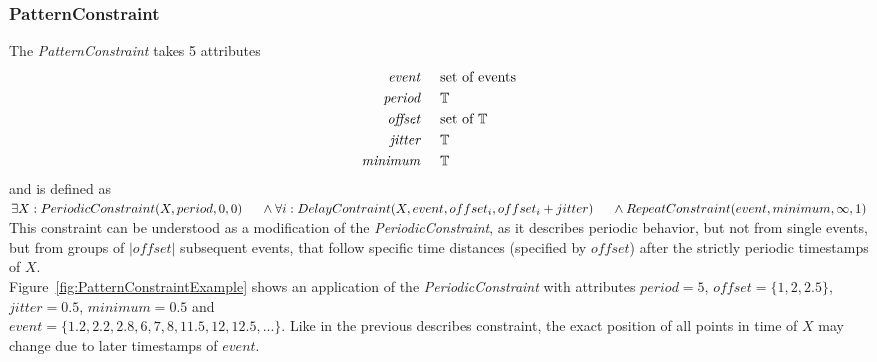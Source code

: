 		
	\subsubsection{PatternConstraint}
		The \emph{PatternConstraint} takes 5 attributes
		\begin{align*}
			\emph{event} 	& \hspace{.5cm}\text{set of events}\\
			\emph{period} 	& \hspace{.5cm}\mathbb{T}\\
			\emph{offset}	& \hspace{.5cm} \text{set of }\mathbb{T}\\
			\emph{jitter}	& \hspace{.5cm}\mathbb{T}\\
			\emph{minimum}	& \hspace{.5cm}\mathbb{T}
		\end{align*}
		and is defined as \\[10pt]
		\begin{math}
			\exists X: PeriodicConstraint(X, period, 0, 0)\\
			\text{\hspace{.5cm}} \land \forall i: DelayContraint(X, event, offset_i, offset_i+jitter)\\
			\text{\hspace{.5cm}} \land RepeatConstraint(event, minimum, \infty, 1)
		\end{math}\\[10pt]
		This constraint can be understood as a modification of the \emph{PeriodicConstraint}, as it describes periodic behavior, but not from single events, but from groups of $|offset|$ subsequent events, that follow specific time distances (specified by $offset$) after the strictly periodic timestamps of $X$.\\
		Figure~\ref{fig:PatternConstraintExample} shows an application of the \emph{PeriodicConstraint} with attributes $period=5$, $offset=\{1, 2, 2.5\}$, $jitter=0.5$, $minimum=0.5$ and\\
		$event = \{1.2, 2.2, 2.8, 6, 7, 8, 11.5, 12, 12.5, ...\}$. Like in the previous describes constraint, the exact position of all points in time of $X$ may change due to later timestamps of $event$.
		
